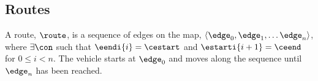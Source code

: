 \subsection{Routes}
A route, $\route$, is a sequence of edges on the map, $\langle \edge_0, \edge_1, \dots \edge_n \rangle$, where $\exists \con$ such that $\eendi{i} = \cestart$ and $\estarti{i+1} = \ceend$ for $0\leq i< n$.
The vehicle starts at $\edge_0$ and moves along the sequence until $\edge_n$ has been reached.





